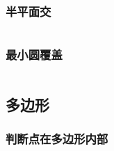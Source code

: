 \documentclass[landscape, twoside, a4paper]{article}
\newcommand{\cppcode}[1]{
	\inputminted[mathescape,
	frame=lines,linenos]{cpp}{source/#1}
}
\begin{document}
\begin{multicols}{2}
\begin{spacing}{0.8}
\subsubsection{半平面交}

\cppcode{computational-geometry/halfplaneintersection.cpp}





\subsubsection{最小圆覆盖}

\cppcode{computational-geometry/mincir.cpp}













\subsection{多边形}


\subsubsection{判断点在多边形内部}



\end{spacing}
\end{multicols}
\end{document}
